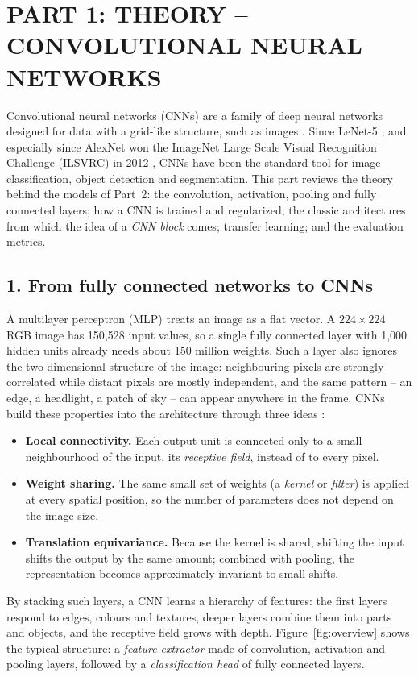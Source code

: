 \documentclass[12pt,letterpaper]{article}
\begin{document}
\setcounter{page}{1}
{\small\tableofcontents}
\newpage

\section{PART 1: THEORY -- CONVOLUTIONAL NEURAL NETWORKS}

Convolutional neural networks (CNNs) are a family of deep neural networks designed for data with a grid-like
structure, such as images \cite{goodfellow2016}. Since LeNet-5 \cite{lecun1998}, and especially since AlexNet won
the ImageNet Large Scale Visual Recognition Challenge (ILSVRC) in 2012 \cite{krizhevsky2012}, CNNs have been the
standard tool for image classification, object detection and segmentation. This part reviews the theory behind the
models of Part~2: the convolution, activation, pooling and fully connected layers; how a CNN is trained and
regularized; the classic architectures from which the idea of a \emph{CNN block} comes; transfer learning; and the
evaluation metrics.

\subsection{1. From fully connected networks to CNNs}
A multilayer perceptron (MLP) treats an image as a flat vector. A $224\times224$ RGB image has 150{,}528 input values,
so a single fully connected layer with 1{,}000 hidden units already needs about 150 million weights. Such a layer
also ignores the two-dimensional structure of the image: neighbouring pixels are strongly correlated while distant
pixels are mostly independent, and the same pattern -- an edge, a headlight, a patch of sky -- can appear anywhere in
the frame. CNNs build these properties into the architecture through three ideas \cite{goodfellow2016,zhang2023}:
\begin{itemize}
  \item \textbf{Local connectivity.} Each output unit is connected only to a small neighbourhood of the input, its
        \emph{receptive field}, instead of to every pixel.
  \item \textbf{Weight sharing.} The same small set of weights (a \emph{kernel} or \emph{filter}) is applied at every
        spatial position, so the number of parameters does not depend on the image size.
  \item \textbf{Translation equivariance.} Because the kernel is shared, shifting the input shifts the output by the
        same amount; combined with pooling, the representation becomes approximately invariant to small shifts.
\end{itemize}
By stacking such layers, a CNN learns a hierarchy of features: the first layers respond to edges, colours and
textures, deeper layers combine them into parts and objects, and the receptive field grows with depth.
Figure~\ref{fig:overview} shows the typical structure: a \emph{feature extractor} made of convolution, activation
and pooling layers, followed by a \emph{classification head} of fully connected layers.
\end{document}
